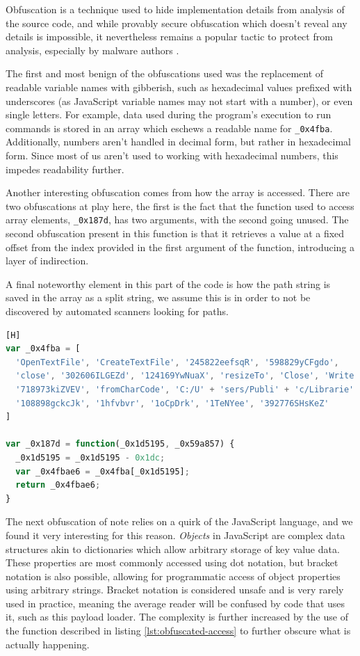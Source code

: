 Obfuscation is a technique used to hide implementation details from analysis of the source code, and while provably
secure obfuscation which doesn't reveal any details is impossible, it nevertheless remains a popular tactic to 
protect from analysis, especially by malware authors \cite{obfuscation}. 

The first and most benign of the obfuscations used was the replacement of readable variable names with gibberish, such
as hexadecimal values prefixed with underscores (as JavaScript variable names may not start with a number), or even
single letters. For example, data used during the program's execution to run commands is stored in an array which
eschews a readable name for \verb+_0x4fba+. Additionally, numbers aren't handled in decimal form, but rather in
hexadecimal form. Since most of us aren't used to working with hexadecimal numbers, this impedes readability further.

Another interesting obfuscation comes from how the array is accessed. There are two obfuscations at play here, the
first is the fact that the function used to access array elements, \verb+_0x187d+, has two arguments, with the second
going unused. The second obfuscation present in this function is that it retrieves a value at a fixed offset from the
index provided in the first argument of the function, introducing a layer of indirection.

A final noteworthy element in this part of the code is how the path string is saved in the array as a split string, we
assume this is in order to not be discovered by automated scanners looking for paths.

\begin{lstlisting}[language=JavaScript, label={lst:obfuscated-access}, caption={Obfuscated data retrieval from an array.}][H]
var _0x4fba = [
  'OpenTextFile', 'CreateTextFile', '245822eefsqR', '598829yCFgdo',
  'close', '302606ILGEZd', '124169YwNuaX', 'resizeTo', 'Close', 'Write',
  '718973kiZVEV', 'fromCharCode', 'C:/U' + 'sers/Publi' + 'c/Librarie' +'s/App' + 'Store.e' + 'xe',
  '108898gckcJk', '1hfvbvr', '1oCpDrk', '1TeNYee', '392776SHsKeZ'
]

var _0x187d = function(_0x1d5195, _0x59a857) {
  _0x1d5195 = _0x1d5195 - 0x1dc;
  var _0x4fbae6 = _0x4fba[_0x1d5195];
  return _0x4fbae6;
}
\end{lstlisting}

The next obfuscation of note relies on a quirk of the JavaScript language, and we found it very interesting for this
reason. \emph{Objects} in JavaScript are complex data structures akin to dictionaries which allow arbitrary storage of
key value data. These properties are most commonly accessed using dot notation, but bracket notation is also possible,
allowing for programmatic access of object properties using arbitrary strings. Bracket notation is considered unsafe and 
is very rarely used in practice, meaning the average reader will be confused by code that uses it, such as this payload
loader. The complexity is further increased by the use of the function described in listing \ref{lst:obfuscated-access} 
to further obscure what is actually happening.

